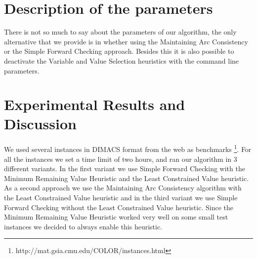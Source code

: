 \documentclass[a4paper]{scrartcl}
\begin{document}
\section{Description of the parameters}

There is not so much to say about the parameters of our algorithm, the only alternative that we provide is in whether using the Maintaining Arc Consistency or the Simple Forward Checking approach. Besides this it is also possible to deactivate the Variable and Value Selection heuristics with the command line parameters.

\section{Experimental Results and Discussion}

We used several instances in DIMACS format from the web as benchmarks \footnote{http://mat.gsia.cmu.edu/COLOR/instances.html}. For all the instances we set a time limit of two hours, and ran our algorithm in 3 different variants. In the first variant we use Simple Forward Checking with the Minimum Remaining Value Heuristic and the Least Constrained Value heuristic. As a second approach we use the Maintaining Arc Consistency algorithm with the Least Constrained Value heuristic and in the third variant we use Simple Forward Checking without the Least Constrained Value heuristic. Since the Minimum Remaining Value Heuristic worked very well on some small test instances we decided to always enable this heuristic. 
\end{document}
